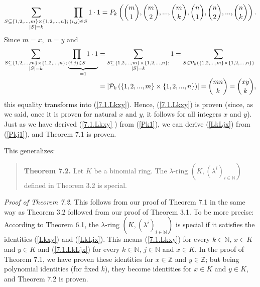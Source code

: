 \documentclass[12pt,final,notitlepage,onecolumn,german]{article}%
\begin{document}
\[
\sum_{\substack{S\subseteq\left\{  1,2,...,m\right\}  \times\left\{
1,2,...,n\right\}  ;\\\left\vert S\right\vert =k}}\prod_{\left(  i,j\right)
\in S}1\cdot1=P_{k}\left(  \dbinom{m}{1},\dbinom{m}{2},...,\dbinom{m}%
{k},\dbinom{n}{1},\dbinom{n}{2},...,\dbinom{n}{k}\right)  .
\]
Since $m=x,$ $n=y$ and
\begin{align*}
\sum_{\substack{S\subseteq\left\{  1,2,...,m\right\}  \times\left\{
1,2,...,n\right\}  ;\\\left\vert S\right\vert =k}}\underbrace{\prod_{\left(
i,j\right)  \in S}1\cdot1}_{=1}  &  =\sum_{\substack{S\subseteq\left\{
1,2,...,m\right\}  \times\left\{  1,2,...,n\right\}  ;\\\left\vert
S\right\vert =k}}1=\sum_{S\in\mathcal{P}_{k}\left(  \left\{
1,2,...,m\right\}  \times\left\{  1,2,...,n\right\}  \right)  }\\
&  =\left\vert \mathcal{P}_{k}\left(  \left\{  1,2,...,m\right\}
\times\left\{  1,2,...,n\right\}  \right)  \right\vert =\dbinom{mn}{k}%
=\dbinom{xy}{k},
\end{align*}
this equality transforms into (\ref{7.1.Lkxy}). Hence, (\ref{7.1.Lkxy}) is
proven (since, as we said, once it is proven for natural $x$ and $y$, it
follows for all integers $x$ and $y$). Just as we have derived (\ref{7.1.Lkxy}%
) from (\ref{Pk1}), we can derive (\ref{LkLjx}) from (\ref{Pkj1}), and Theorem
7.1 is proven.

This generalizes:

\begin{quote}
\textbf{Theorem 7.2.} Let $K$ be a binomial ring. The $\lambda$-ring $\left(
K,\left(  \lambda^{i}\right)  _{i\in\mathbb{N}}\right)  $ defined in Theorem
3.2 is special.
\end{quote}

\textit{Proof of Theorem 7.2.} This follows from our proof of Theorem 7.1 in
the same way as Theorem 3.2 followed from our proof of Theorem 3.1. To be more
precise: According to Theorem 6.1, the $\lambda$-ring $\left(  K,\left(
\lambda^{i}\right)  _{i\in\mathbb{N}}\right)  $ is special if it satisfies the
identities (\ref{Lkxy}) and (\ref{LkLjx}). This means (\ref{7.1.Lkxy}) for
every $k\in\mathbb{N}$, $x\in K$ and $y\in K$ and (\ref{7.1.LkLjx}) for every
$k\in\mathbb{N}$, $j\in\mathbb{N}$ and $x\in K$. In the proof of Theorem 7.1,
we have proven these identities for $x\in\mathbb{Z}$ and $y\in\mathbb{Z}$; but
being polynomial identities (for fixed $k$), they become identities for $x\in
K$ and $y\in K$, and Theorem 7.2 is proven.
\end{document}
